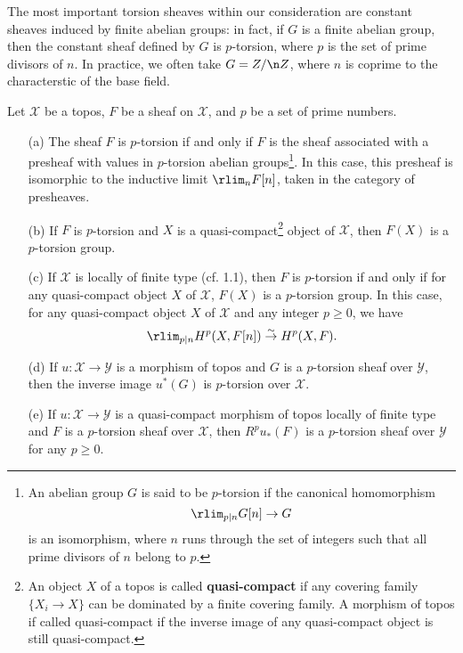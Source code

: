 The most important torsion sheaves within our consideration are constant sheaves induced by finite abelian groups: in fact, if $G$ is a finite abelian group, then the constant sheaf defined by $G$ is $p$-torsion, where $p$ is the set of prime divisors of $n$. In practice, we often take $G=Z/\n Z$, where $n$ is coprime to the characterstic of the base field.

\begin{proposition}\label{topos p-torsion abelian sheaf prop}
Let $\mathcal{X}$ be a topos, $F$ be a sheaf on $\mathcal{X}$, and $p$ be a set of prime numbers.
\begin{enumerate}
    \item[(a)] The sheaf $F$ is $p$-torsion if and only if $F$ is the sheaf associated with a presheaf with values in $p$-torsion abelian groups\footnote{An abelian group $G$ is said to be $p$-torsion if the canonical homomorphism
    \[\rlim_{p\mid n} G[n]\to G\]
    is an isomorphism, where $n$ runs through the set of integers such that all prime divisors of $n$ belong to $p$.}. In this case, this presheaf is isomorphic to the inductive limit $\rlim_n F[n]$, taken in the category of presheaves.
    \item[(b)] If $F$ is $p$-torsion and $X$ is a quasi-compact\footnote{An object $X$ of a topos is called \textbf{quasi-compact} if any covering family $\{X_i\to X\}$ can be dominated by a finite covering family. A morphism of topos if called quasi-compact if the inverse image of any quasi-compact object is still quasi-compact.} object of $\mathcal{X}$, then $F(X)$ is a $p$-torsion group.
    \item[(c)] If $\mathcal{X}$ is locally of finite type (cf. \cite{SGA4-2}  1.1), then $F$ is $p$-torsion if and only if for any quasi-compact object $X$ of $\mathcal{X}$, $F(X)$ is a $p$-torsion group. In this case, for any quasi-compact object $X$ of $\mathcal{X}$ and any integer $p\geq 0$, we have
    \[\rlim_{p\mid n} H^p(X,F[n])\stackrel{\sim}{\to} H^p(X,F).\]
    \item[(d)] If $u:\mathcal{X}\to\mathcal{Y}$ is a morphism of topos and $G$ is a $p$-torsion sheaf over $\mathcal{Y}$, then the inverse image $u^*(G)$ is $p$-torsion over $\mathcal{X}$.
    \item[(e)] If $u:\mathcal{X}\to\mathcal{Y}$ is a quasi-compact morphism of topos locally of finite type and $F$ is a $p$-torsion sheaf over $\mathcal{X}$, then $R^pu_*(F)$ is a $p$-torsion sheaf over $\mathcal{Y}$ for any $p\geq 0$.
\end{enumerate}
\end{proposition}
